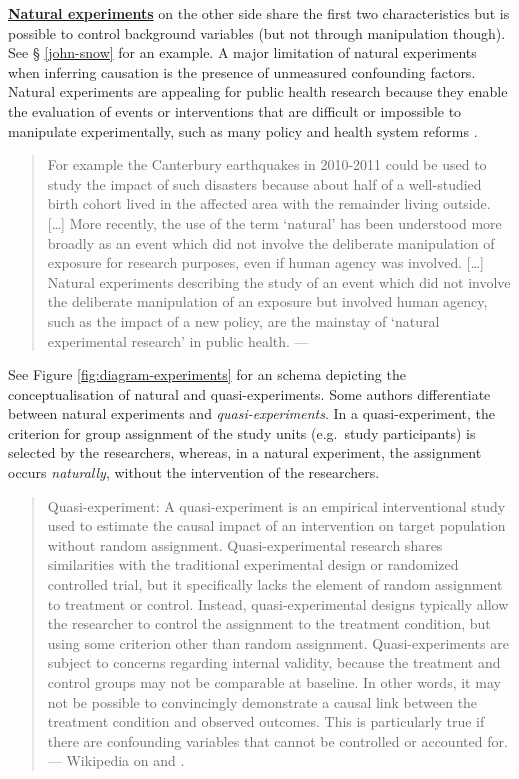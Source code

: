 \documentclass[
]{book}
\begin{document}
\href{https://en.wikipedia.org/wiki/Natural_experiment}{\textbf{Natural experiments}} on the other side share the first two characteristics but is possible to control background variables (but not through manipulation though). See § \ref{john-snow} for an example. A major limitation of natural experiments when inferring causation is the presence of unmeasured confounding factors. Natural experiments are appealing for public health research because they enable the evaluation of events or interventions that are difficult or impossible to manipulate experimentally, such as many policy and health system reforms \citep{de2021conceptualising}.

\begin{quote}
For example the Canterbury earthquakes in 2010-2011 could be used to study the impact of such disasters because about half of a well-studied birth cohort lived in the affected area with the remainder living outside. {[}\ldots{]} More recently, the use of the term `natural' has been understood more broadly as an event which did not involve the deliberate manipulation of exposure for research purposes, even if human agency was involved. {[}\ldots{]} Natural experiments describing the study of an event which did not involve the deliberate manipulation of an exposure but involved human agency, such as the impact of a new policy, are the mainstay of `natural experimental research' in public health. --- \citep{de2021conceptualising}
\end{quote}

See Figure \ref{fig:diagram-experiments} for an schema depicting the conceptualisation of natural and quasi-experiments. Some authors differentiate between natural experiments and \emph{quasi-experiments}. In a quasi-experiment, the criterion for group assignment of the study units (e.g.~study participants) is selected by the researchers, whereas, in a natural experiment, the assignment occurs \emph{naturally}, without the intervention of the researchers.

\begin{quote}
Quasi-experiment: A quasi-experiment is an empirical interventional study used to estimate the causal impact of an intervention on target population without random assignment. Quasi-experimental research shares similarities with the traditional experimental design or randomized controlled trial, but it specifically lacks the element of random assignment to treatment or control. Instead, quasi-experimental designs typically allow the researcher to control the assignment to the treatment condition, but using some criterion other than random assignment. Quasi-experiments are subject to concerns regarding internal validity, because the treatment and control groups may not be comparable at baseline. In other words, it may not be possible to convincingly demonstrate a causal link between the treatment condition and observed outcomes. This is particularly true if there are confounding variables that cannot be controlled or accounted for. --- Wikipedia on \citep{rossi1985evaluation} and \citep{dinardo2010natural}.
\end{quote}
\end{document}
